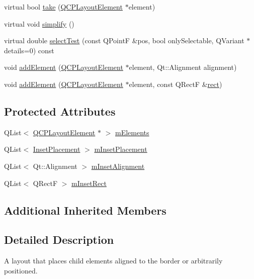 \begin{DoxyCompactItemize}
\item 
virtual bool \hyperlink{class_q_c_p_layout_inset_a9ac707ccff650633b97f52dd5cddcf49}{take} (\hyperlink{class_q_c_p_layout_element}{Q\+C\+P\+Layout\+Element} $\ast$element)
\item 
virtual void \hyperlink{class_q_c_p_layout_inset_abb9eb23bf2d7c587a8abe02d065eae0a}{simplify} ()
\item 
virtual double \hyperlink{class_q_c_p_layout_inset_ab5a2f2b88c05e369fd7da9583d17aa3a}{select\+Test} (const Q\+Point\+F \&pos, bool only\+Selectable, Q\+Variant $\ast$details=0) const 
\item 
void \hyperlink{class_q_c_p_layout_inset_ad61529eb576af7f04dff94abb10c745a}{add\+Element} (\hyperlink{class_q_c_p_layout_element}{Q\+C\+P\+Layout\+Element} $\ast$element, Qt\+::\+Alignment alignment)
\item 
void \hyperlink{class_q_c_p_layout_inset_a8ff61fbee4a1f0ff45c398009d9f1e56}{add\+Element} (\hyperlink{class_q_c_p_layout_element}{Q\+C\+P\+Layout\+Element} $\ast$element, const Q\+Rect\+F \&\hyperlink{class_q_c_p_layout_element_affdfea003469aac3d0fac5f4e06171bc}{rect})
\end{DoxyCompactItemize}
\subsection*{Protected Attributes}
\begin{DoxyCompactItemize}
\item 
Q\+List$<$ \hyperlink{class_q_c_p_layout_element}{Q\+C\+P\+Layout\+Element} $\ast$ $>$ \hyperlink{class_q_c_p_layout_inset_a8fff7eae9a1be9a5c1e544fb379f682f}{m\+Elements}
\item 
Q\+List$<$ \hyperlink{class_q_c_p_layout_inset_a8b9e17d9a2768293d2a7d72f5e298192}{Inset\+Placement} $>$ \hyperlink{class_q_c_p_layout_inset_a57a0a4e445cc78eada29765ecf092abe}{m\+Inset\+Placement}
\item 
Q\+List$<$ Qt\+::\+Alignment $>$ \hyperlink{class_q_c_p_layout_inset_a55e9b84c310136ff985a6544184ab64a}{m\+Inset\+Alignment}
\item 
Q\+List$<$ Q\+Rect\+F $>$ \hyperlink{class_q_c_p_layout_inset_aaa8f6b5029458f3d97a65239524a2b33}{m\+Inset\+Rect}
\end{DoxyCompactItemize}
\subsection*{Additional Inherited Members}


\subsection{Detailed Description}
A layout that places child elements aligned to the border or arbitrarily positioned. 

